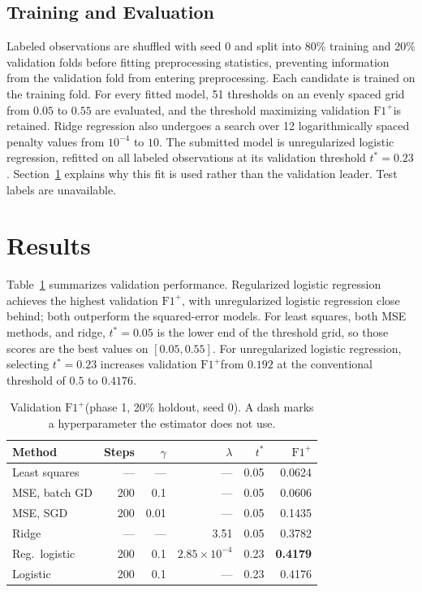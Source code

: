 \documentclass[10pt,conference,compsocconf]{IEEEtran}
\newcommand{\Fp}{\ensuremath{\mathrm{F1}^{+}}}
\begin{document}
\subsection{Training and Evaluation}
Labeled observations are shuffled with seed $0$ and split into 80\% training and 20\% validation folds before fitting preprocessing statistics, preventing information from the validation fold from entering preprocessing. Each candidate is trained on the training fold. For every fitted model, 51 thresholds on an evenly spaced grid from $0.05$ to $0.55$ are evaluated, and the threshold maximizing validation \Fp is retained. Ridge regression also undergoes a search over 12 logarithmically spaced penalty values from $10^{-4}$ to $10$. The submitted model is unregularized logistic regression, refitted on all labeled observations at its validation threshold $t^\ast=0.23$. Section~\ref{sec:results} explains why this fit is used rather than the validation leader. Test labels are unavailable.

\section{Results}
\label{sec:results}

Table~\ref{tab:methods} summarizes validation performance. Regularized logistic regression achieves the highest validation \Fp, with unregularized logistic regression close behind; both outperform the squared-error models. For least squares, both MSE methods, and ridge, $t^\ast=0.05$ is the lower end of the threshold grid, so those scores are the best values on $[0.05,0.55]$. For unregularized logistic regression, selecting $t^\ast=0.23$ increases validation \Fp from $0.192$ at the conventional threshold of $0.5$ to $0.4176$.

\begin{table}[t]
  \centering
  \caption{Validation \Fp (phase 1, 20\% holdout, seed 0). A dash marks a hyperparameter the estimator does not use.}
  \label{tab:methods}
  \footnotesize
  \begin{tabular}{@{}lrrrrr@{}}
    \toprule
    Method & Steps & $\gamma$ & $\lambda$ & $t^\ast$ & \Fp \\
    \midrule
    Least squares & --- & --- & --- & 0.05 & 0.0624 \\
    MSE, batch GD & 200 & 0.1 & --- & 0.05 & 0.0606 \\
    MSE, SGD & 200 & 0.01 & --- & 0.05 & 0.1435 \\
    Ridge & --- & --- & 3.51 & 0.05 & 0.3782 \\
    Reg.\ logistic & 200 & 0.1 & $2.85\times 10^{-4}$ & 0.23 & \textbf{0.4179} \\
    Logistic & 200 & 0.1 & --- & 0.23 & 0.4176 \\
    \bottomrule
  \end{tabular}
\end{table}
\end{document}
